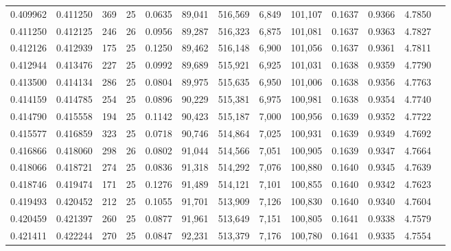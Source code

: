 \begin{tabular}{rrrrrrrrrrrrr}
0.409962 & 0.411250 &   369 &  25 &                                     0.0635 &  89,041 & 516,569 &   6,849 & 101,107 & 0.1637 & 0.9366 & 4.7850 \\
0.411250 & 0.412125 &   246 &  26 &                                     0.0956 &  89,287 & 516,323 &   6,875 & 101,081 & 0.1637 & 0.9363 & 4.7827 \\
0.412126 & 0.412939 &   175 &  25 &                                     0.1250 &  89,462 & 516,148 &   6,900 & 101,056 & 0.1637 & 0.9361 & 4.7811 \\
0.412944 & 0.413476 &   227 &  25 &                                     0.0992 &  89,689 & 515,921 &   6,925 & 101,031 & 0.1638 & 0.9359 & 4.7790 \\
0.413500 & 0.414134 &   286 &  25 &                                     0.0804 &  89,975 & 515,635 &   6,950 & 101,006 & 0.1638 & 0.9356 & 4.7763 \\
0.414159 & 0.414785 &   254 &  25 &                                     0.0896 &  90,229 & 515,381 &   6,975 & 100,981 & 0.1638 & 0.9354 & 4.7740 \\
0.414790 & 0.415558 &   194 &  25 &                                     0.1142 &  90,423 & 515,187 &   7,000 & 100,956 & 0.1639 & 0.9352 & 4.7722 \\
0.415577 & 0.416859 &   323 &  25 &                                     0.0718 &  90,746 & 514,864 &   7,025 & 100,931 & 0.1639 & 0.9349 & 4.7692 \\
0.416866 & 0.418060 &   298 &  26 &                                     0.0802 &  91,044 & 514,566 &   7,051 & 100,905 & 0.1639 & 0.9347 & 4.7664 \\
0.418066 & 0.418721 &   274 &  25 &                                     0.0836 &  91,318 & 514,292 &   7,076 & 100,880 & 0.1640 & 0.9345 & 4.7639 \\
0.418746 & 0.419474 &   171 &  25 &                                     0.1276 &  91,489 & 514,121 &   7,101 & 100,855 & 0.1640 & 0.9342 & 4.7623 \\
0.419493 & 0.420452 &   212 &  25 &                                     0.1055 &  91,701 & 513,909 &   7,126 & 100,830 & 0.1640 & 0.9340 & 4.7604 \\
0.420459 & 0.421397 &   260 &  25 &                                     0.0877 &  91,961 & 513,649 &   7,151 & 100,805 & 0.1641 & 0.9338 & 4.7579 \\
0.421411 & 0.422244 &   270 &  25 &                                     0.0847 &  92,231 & 513,379 &   7,176 & 100,780 & 0.1641 & 0.9335 & 4.7554 \\

\end{tabular}
